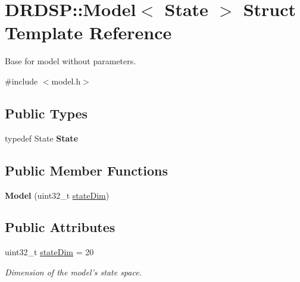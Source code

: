 \hypertarget{struct_d_r_d_s_p_1_1_model}{\section{D\-R\-D\-S\-P\-:\-:Model$<$ State $>$ Struct Template Reference}
\label{struct_d_r_d_s_p_1_1_model}
}


Base for model without parameters.  




{\ttfamily \#include $<$model.\-h$>$}

\subsection*{Public Types}
\begin{DoxyCompactItemize}
\item 
\hypertarget{struct_d_r_d_s_p_1_1_model_a30ca6d1a4dbcb6801ccb5a2421cbc434}{typedef State {\bfseries State}}\label{struct_d_r_d_s_p_1_1_model_a30ca6d1a4dbcb6801ccb5a2421cbc434}

\end{DoxyCompactItemize}
\subsection*{Public Member Functions}
\begin{DoxyCompactItemize}
\item 
\hypertarget{struct_d_r_d_s_p_1_1_model_aa14d5a47ab0d94ab7c17ffe9c50125a4}{{\bfseries Model} (uint32\-\_\-t \hyperlink{struct_d_r_d_s_p_1_1_model_a5689ac0bda80d0ae6db69443439ce1b5}{state\-Dim})}\label{struct_d_r_d_s_p_1_1_model_aa14d5a47ab0d94ab7c17ffe9c50125a4}

\end{DoxyCompactItemize}
\subsection*{Public Attributes}
\begin{DoxyCompactItemize}
\item 
\hypertarget{struct_d_r_d_s_p_1_1_model_a5689ac0bda80d0ae6db69443439ce1b5}{uint32\-\_\-t \hyperlink{struct_d_r_d_s_p_1_1_model_a5689ac0bda80d0ae6db69443439ce1b5}{state\-Dim} = 20}\label{struct_d_r_d_s_p_1_1_model_a5689ac0bda80d0ae6db69443439ce1b5}

\begin{DoxyCompactList}\small\item\em Dimension of the model's state space. \end{DoxyCompactList}\end{DoxyCompactItemize}


